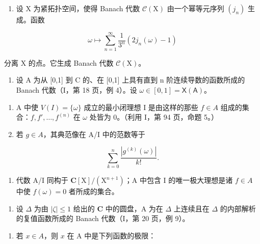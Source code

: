 \begin{enumerate}
\def\labelenumi{\arabic{enumi})}
\setcounter{enumi}{3}
\tightlist
\item
  设 X 为紧拓扑空间，使得 Banach 代数 \(\mathcal{C}(\mathrm{X})\) 由一个幂等元序列 \((j_n)\) 生成。函数
\end{enumerate}

\[
\omega \mapsto \sum_ {n = 1} ^ {\infty} \frac {1}{3 ^ {n}} (2 j _ {n} (\omega) - 1)
\]

分离 X 的点。它生成 Banach 代数 \(\mathcal{C}(\mathrm{X})\)。

\begin{enumerate}
\def\labelenumi{\arabic{enumi})}
\setcounter{enumi}{4}
\tightlist
\item
  设 A 为从 {[}0,1{]} 到 C 的、在 {[}0,1{]} 上具有直到 n 阶连续导数的函数所成的 Banach 代数（I，第 18 页，例 4）。设 \(\omega \in [0,1] = \mathsf{X}(\mathsf{A})\)。
\end{enumerate}

\begin{enumerate}
\def\labelenumi{\alph{enumi})}
\item
  A 中使 \(V(I) = \{\omega\}\) 成立的最小闭理想 I 是由这样的那些 \(f \in A\) 组成的集合：\(f, f', \ldots, f^{(n)}\) 在 \(\omega\) 处皆为 0。（利用 I，第 94 页，命题 5。）
\item
  若 \(g \in A\)，其典范像在 A/I 中的范数等于
\end{enumerate}

\[
\sum_ {k = 0} ^ {n} \frac {| g ^ {(k)} (\omega) |}{k !}.
\]

\begin{enumerate}
\def\labelenumi{\alph{enumi})}
\setcounter{enumi}{2}
\tightlist
\item
  代数 A/I 同构于 \(\mathbf{C}[\mathrm{X}]/(\mathrm{X}^{n+1})\)；A 中包含 I 的唯一极大理想是诸 \(f \in A\) 中使 \(f(\omega) = 0\) 者所成的集合。
\end{enumerate}

\begin{enumerate}
\def\labelenumi{\arabic{enumi})}
\setcounter{enumi}{5}
\tightlist
\item
  设 \(\Delta\) 为由 \(|\zeta| \leqslant 1\) 给出的 \(\mathbf{C}\) 中的圆盘，A 为在 \(\Delta\) 上连续且在 \(\Delta\) 的内部解析的复值函数所成的 Banach 代数（I，第 20 页，例 9）。
\end{enumerate}

\begin{enumerate}
\def\labelenumi{\alph{enumi})}
\tightlist
\item
  若 \(x \in A\)，则 \(x\) 在 A 中是下列函数的极限：
\end{enumerate}

